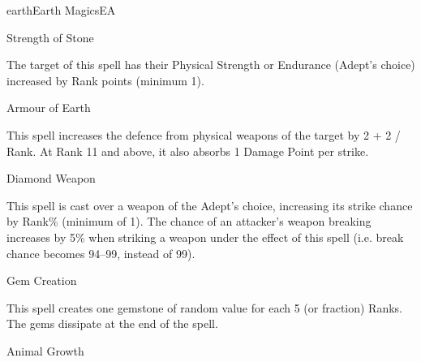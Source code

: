 \begin{College}[1.2]{earth}{Earth Magics}{EA}
\begin{spell}[S-3]{Strength of Stone}

\begin{effects}
The target of this spell has their Physical Strength or Endurance
(Adept’s choice) increased by Rank points (minimum 1).
\end{effects}
\end{spell}

\begin{spell}[S-4]{Armour of Earth}

\begin{effects}
This spell increases the defence from physical weapons of the target
by 2 + 2 / Rank.  At Rank 11 and above, it also absorbs 1 Damage Point
per strike.

\end{effects}
\end{spell}

\begin{spell}[S-5]{Diamond Weapon}

\begin{effects}
This spell is cast over a weapon of the Adept’s choice, increasing its
strike chance by Rank\% (minimum of 1).  The chance of an attacker’s
weapon breaking increases by 5\% when striking a weapon under the
effect of this spell (i.e.  break chance becomes 94–99, instead of
99).
\end{effects}
\end{spell}

\begin{spell}[S-6]{Gem Creation}

\begin{effects}
This spell creates one gemstone of random value for each 5 (or
fraction) Ranks.  The gems dissipate at the end of the spell.
\end{effects}
\end{spell}

\begin{spell}[S-7]{Animal Growth}


\end{spell}
\end{College}
